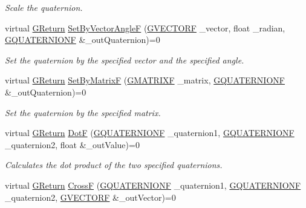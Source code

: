 \begin{DoxyCompactItemize}
\begin{DoxyCompactList}\small\item\em Scale the quaternion. \end{DoxyCompactList}\item 
virtual \mbox{\hyperlink{namespaceGW_a67a839e3df7ea8a5c5686613a7a3de21}{G\+Return}} \mbox{\hyperlink{classGW_1_1MATH_1_1GQuaternion_a70d41e1e78ed85814b22eb4a328b6876}{Set\+By\+Vector\+AngleF}} (\mbox{\hyperlink{structGW_1_1MATH_1_1GVECTORF}{G\+V\+E\+C\+T\+O\+RF}} \+\_\+vector, float \+\_\+radian, \mbox{\hyperlink{structGW_1_1MATH_1_1GQUATERNIONF}{G\+Q\+U\+A\+T\+E\+R\+N\+I\+O\+NF}} \&\+\_\+out\+Quaternion)=0
\begin{DoxyCompactList}\small\item\em Set the quaternion by the specified vector and the specified angle. \end{DoxyCompactList}\item 
virtual \mbox{\hyperlink{namespaceGW_a67a839e3df7ea8a5c5686613a7a3de21}{G\+Return}} \mbox{\hyperlink{classGW_1_1MATH_1_1GQuaternion_aec0eb6ee4ee1557117b03a2104be21f0}{Set\+By\+MatrixF}} (\mbox{\hyperlink{structGW_1_1MATH_1_1GMATRIXF}{G\+M\+A\+T\+R\+I\+XF}} \+\_\+matrix, \mbox{\hyperlink{structGW_1_1MATH_1_1GQUATERNIONF}{G\+Q\+U\+A\+T\+E\+R\+N\+I\+O\+NF}} \&\+\_\+out\+Quaternion)=0
\begin{DoxyCompactList}\small\item\em Set the quaternion by the specified matrix. \end{DoxyCompactList}\item 
virtual \mbox{\hyperlink{namespaceGW_a67a839e3df7ea8a5c5686613a7a3de21}{G\+Return}} \mbox{\hyperlink{classGW_1_1MATH_1_1GQuaternion_a3bb06da263ec25caa24f12a054ac0bd1}{DotF}} (\mbox{\hyperlink{structGW_1_1MATH_1_1GQUATERNIONF}{G\+Q\+U\+A\+T\+E\+R\+N\+I\+O\+NF}} \+\_\+quaternion1, \mbox{\hyperlink{structGW_1_1MATH_1_1GQUATERNIONF}{G\+Q\+U\+A\+T\+E\+R\+N\+I\+O\+NF}} \+\_\+quaternion2, float \&\+\_\+out\+Value)=0
\begin{DoxyCompactList}\small\item\em Calculates the dot product of the two specified quaternions. \end{DoxyCompactList}\item 
virtual \mbox{\hyperlink{namespaceGW_a67a839e3df7ea8a5c5686613a7a3de21}{G\+Return}} \mbox{\hyperlink{classGW_1_1MATH_1_1GQuaternion_ac3ee5d4e49669083b9ea57dd408edbbe}{CrossF}} (\mbox{\hyperlink{structGW_1_1MATH_1_1GQUATERNIONF}{G\+Q\+U\+A\+T\+E\+R\+N\+I\+O\+NF}} \+\_\+quaternion1, \mbox{\hyperlink{structGW_1_1MATH_1_1GQUATERNIONF}{G\+Q\+U\+A\+T\+E\+R\+N\+I\+O\+NF}} \+\_\+quaternion2, \mbox{\hyperlink{structGW_1_1MATH_1_1GVECTORF}{G\+V\+E\+C\+T\+O\+RF}} \&\+\_\+out\+Vector)=0

\end{DoxyCompactItemize}
